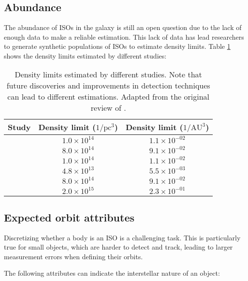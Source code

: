 \subsection{Abundance}
The abundance of ISOs in the galaxy is still an open question due to the lack of
enough data to make a reliable estimation. This lack of data has lead
researchers to generate synthetic populations of ISOs to estimate density
limits. Table \ref{tab:iso_density_limits} shows the density limits estimated
by different studies:

\begin{table}[H]
    \centering
    \begin{tabular}{|c|c|c|}
        \hline
        \textbf{Study} & \textbf{Density limit ($1/\text{pc}^3$)} & \textbf{Density limit ($1/\text{AU}^3$)} \\
        \hline
        \cite{gaidos2017} & $1.0 \times 10^{14}$ & $1.1 \times 10^{-02}$ \\
        \cite{jewitt2017} & $8.0 \times 10^{14}$ & $9.1 \times 10^{-02}$ \\
        \cite{portegies2018} & $1.0 \times 10^{14}$ & $1.1 \times 10^{-02}$ \\
        \cite{feng2018} & $4.8 \times 10^{13}$ & $5.5 \times 10^{-03}$ \\
        \cite{fraser2018} & $8.0 \times 10^{14}$ & $9.1 \times 10^{-02}$ \\
        \cite{do2018} & $2.0 \times 10^{15}$ & $2.3 \times 10^{-01}$ \\
        \hline
    \end{tabular}
    \caption[Estimated interlopers abundance]{Density limits estimated by different studies. Note that future
    discoveries and improvements in detection techniques can lead to different
    estimations. Adapted from the original review of \cite{moro2023}.}
    \label{tab:iso_density_limits}
\end{table}


\subsection{Expected orbit attributes}
\label{sec:expected_orbit_attributes}

Discretizing whether a body is an ISO is a challenging task. This is
particularly true for small objects, which are harder to detect and track,
leading to larger measurement errors when defining their orbits. 

The following attributes can indicate the interstellar nature of an object:

